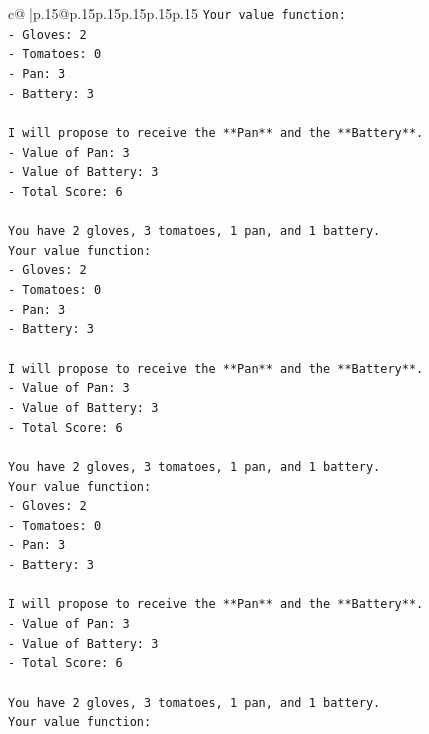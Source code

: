 \documentclass{article}
\begin{document}
{\begin{supertabular}{c@{$\;$}|p{.15\linewidth}@{}p{.15\linewidth}p{.15\linewidth}p{.15\linewidth}p{.15\linewidth}p{.15\linewidth}}
{{{\texttt{Your value function:} \\
\texttt{{-} Gloves: 2} \\
\texttt{{-} Tomatoes: 0} \\
\texttt{{-} Pan: 3} \\
\texttt{{-} Battery: 3} \\
\\ 
\texttt{I will propose to receive the **Pan** and the **Battery**.} \\
\texttt{{-} Value of Pan: 3} \\
\texttt{{-} Value of Battery: 3} \\
\texttt{{-} Total Score: 6} \\
\\ 
\texttt{You have 2 gloves, 3 tomatoes, 1 pan, and 1 battery.} \\
\texttt{Your value function:} \\
\texttt{{-} Gloves: 2} \\
\texttt{{-} Tomatoes: 0} \\
\texttt{{-} Pan: 3} \\
\texttt{{-} Battery: 3} \\
\\ 
\texttt{I will propose to receive the **Pan** and the **Battery**.} \\
\texttt{{-} Value of Pan: 3} \\
\texttt{{-} Value of Battery: 3} \\
\texttt{{-} Total Score: 6} \\
\\ 
\texttt{You have 2 gloves, 3 tomatoes, 1 pan, and 1 battery.} \\
\texttt{Your value function:} \\
\texttt{{-} Gloves: 2} \\
\texttt{{-} Tomatoes: 0} \\
\texttt{{-} Pan: 3} \\
\texttt{{-} Battery: 3} \\
\\ 
\texttt{I will propose to receive the **Pan** and the **Battery**.} \\
\texttt{{-} Value of Pan: 3} \\
\texttt{{-} Value of Battery: 3} \\
\texttt{{-} Total Score: 6} \\
\\ 
\texttt{You have 2 gloves, 3 tomatoes, 1 pan, and 1 battery.} \\
\texttt{Your value function:} \\
}}}
\end{supertabular}}
\end{document}

